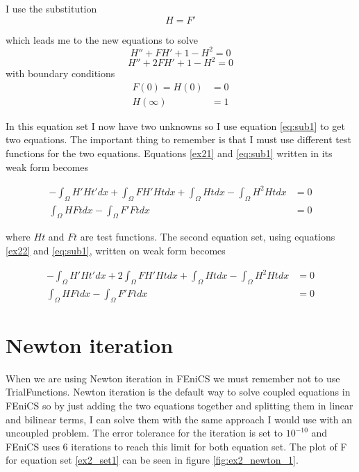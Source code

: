 \documentclass[11pt]{report}
\begin{document}
I use the substitution \begin{equation} H = F' \label{eq:sub1} \end{equation}

which leads me to the new equations to solve
\begin{equation} H'' + FH' + 1 - H^2 = 0 \label{ex21}\end{equation}
\begin{equation} H'' + 2FH' + 1 - H^2 = 0 \label{ex22} \end{equation}
with boundary conditions
\begin{equation}\begin{split} F(0) = H(0) &= 0 \\ H(\infty) &= 1 \end{split}\end{equation} 

In this equation set I now have two unknowns so I use equation \ref{eq:sub1} to get two equations. The important thing to remember is that I must use different test functions for the two equations. Equations \ref{ex21} and \ref{eq:sub1} written in its weak form becomes

\begin{equation}
\begin{split}
-\int _\Omega H' Ht'dx + \int _\Omega FH'Htdx + \int _\Omega Htdx - \int _\Omega H^2Htdx &= 0 \\
\int _\Omega HFtdx - \int _\Omega F'Ftdx &= 0
\end{split}
\label{ex2_set1}
\end{equation}

where $Ht$ and $Ft$ are test functions. The second equation set, using equations \ref{ex22} and \ref{eq:sub1}, written on weak form becomes

\begin{equation}
\begin{split}
-\int _\Omega H' Ht'dx + 2\int _\Omega FH'Htdx + \int _\Omega Htdx - \int _\Omega H^2Htdx &= 0 \\
\int _\Omega HFtdx - \int _\Omega F'Ftdx &= 0
\end{split}
\label{ex2_set2}
\end{equation}

\section*{Newton iteration}

When we are using Newton iteration in FEniCS we must remember not to use TrialFunctions. Newton iteration is the default way to solve coupled equations in FEniCS so by just adding the two equations together and splitting them in linear and bilinear terms, I can solve them with the same approach I would use with an uncoupled problem. The error tolerance for the iteration is set to $10^{-10}$ and FEniCS uses 6 iterations to reach this limit for both equation set. The plot of F for equation set \ref{ex2_set1} can be seen in figure \ref{fig:ex2_newton_1}.
\end{document}

